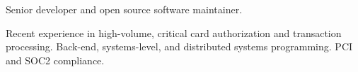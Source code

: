 

\begin{cvparagraph}

  Senior developer and open source software maintainer.

  Recent experience in high-volume, critical card authorization and
  transaction processing. Back-end, systems-level, and distributed
  systems programming. PCI and SOC2 compliance.
\end{cvparagraph}
